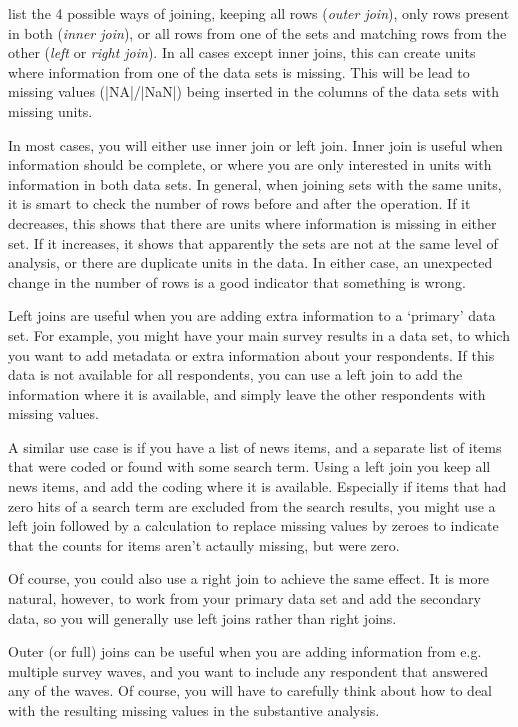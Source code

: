  list the 4 possible ways of joining, keeping all rows (\emph{outer join}), only rows present in both (\emph{inner join}), or all rows from one of the sets and matching rows from the other (\emph{left} or \emph{right join}).
In all cases except inner joins, this can create units where information from one of the data sets is missing.
This will be lead to missing values (|NA|/|NaN|) being inserted in the columns of the data sets with missing units.



In most cases, you will either use inner join or left join.
Inner join is useful when information should be complete,
or where you are only interested in units with information in both data sets.
In general, when joining sets with the same units, it is smart to check the number of rows before and after the operation.
If it decreases, this shows that there are units where information is missing in either set.
If it increases, it shows that apparently the sets are not at the same level of analysis,
or there are duplicate units in the data.
In either case, an unexpected change in the number of rows is a good indicator that something is wrong.

Left joins are useful when you are adding extra information to a `primary' data set.
For example, you might have your main survey results in a data set,
to which you want to add metadata or extra information about your respondents.
If this data is not available for all respondents, you can use a left join to add the information
where it is available, and simply leave the other respondents with missing values.

A similar use case is if you have a list of news items, and a separate list of items that were coded
or found with some search term. Using a left join you keep all news items, and add the coding where it is available.
Especially if items that had zero hits of a search term are excluded from the search results,
you might use a left join followed by a calculation to replace missing values by zeroes to indicate that the counts for
items aren't actaully missing, but were zero. 

Of course, you could also use a right join to achieve the same effect.
It is more natural, however, to work from your primary data set and add the secondary data,
so you will generally use left joins rather than right joins.

Outer (or full) joins can be useful when you are adding information from e.g. multiple survey waves,
and you want to include any respondent that answered any of the waves.
Of course, you will have to carefully think about how to deal with the resulting missing values in the substantive analysis. 

